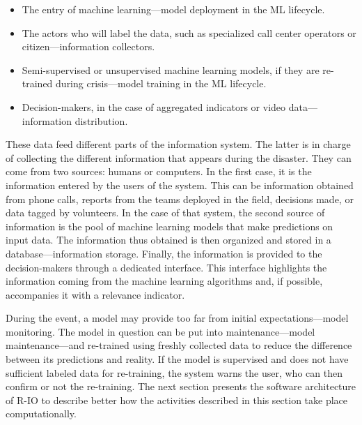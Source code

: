 \begin{itemize}
    \item The entry of machine learning—model deployment in the ML lifecycle.
    \item The actors who will label the data, such as specialized call center operators or citizen—information collectors.
    \item Semi-supervised or unsupervised machine learning models, if they are re-trained during crisis—model training in the ML lifecycle.
    \item Decision-makers, in the case of aggregated indicators or video data—information distribution.
\end{itemize}

These data feed different parts of the information system.
The latter is in charge of collecting the different information that appears during the disaster.
They can come from two sources: humans or computers.
In the first case, it is the information entered by the users of the system.
This can be information obtained from phone calls, reports from the teams deployed in the field, decisions made, or data tagged by volunteers.
In the case of that system, the second source of information is the pool of machine learning models that make predictions on input data.
The information thus obtained is then organized and stored in a database—information storage.
Finally, the information is provided to the decision-makers through a dedicated interface.
This interface highlights the information coming from the machine learning algorithms and, if possible, accompanies it with a relevance indicator.

During the event, a model may provide too far from initial expectations—model monitoring.
The model in question can be put into maintenance—model maintenance—and re-trained using freshly collected data to reduce the difference between its predictions and reality.
If the model is supervised and does not have sufficient labeled data for re-training, the system warns the user, who can then confirm or not the re-training.
The next section presents the software architecture of R-IO to describe better how the activities described in this section take place computationally.

